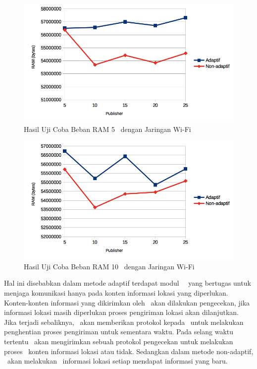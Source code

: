 \noindent
\begin{figure}
  \centering
  \includegraphics[scale=0.90]
	{images/4-ram5.png}
	\caption{Hasil Uji Coba Beban RAM 5 \Subscriber~dengan Jaringan Wi-Fi}
\label{fig:ram_5}
\end{figure}
\noindent

\begin{figure}
  \centering
  \includegraphics[scale=0.90]
	{images/4-ram10.png}
	\caption{Hasil Uji Coba Beban RAM 10 \Subscriber~dengan Jaringan Wi-Fi}
\label{fig:ram_10}
\end{figure}

Hal ini disebabkan dalam metode adaptif terdapat modul \idle~\manager~yang
bertugas untuk menjaga komunikasi hanya pada konten informasi lokasi yang
diperlukan. Konten-konten informasi yang dikirimkan oleh \publisher~akan
dilakukan pengecekan, jika informasi lokasi masih diperlukan proses pengiriman
lokasi akan dilanjutkan. Jika terjadi sebaliknya, \broker~akan memberikan
protokol kepada \publisher~untuk melakukan penghentian proses pengiriman untuk
sementara waktu. Pada selang waktu tertentu \broker~akan mengirimkan sebuah
protokol pengecekan untuk melakukan proses \publish~konten informasi lokasi atau
tidak. Sedangkan dalam metode non-adaptif, \publisher~akan melakukan
\publish~informasi lokasi setiap mendapat informasi yang baru.

